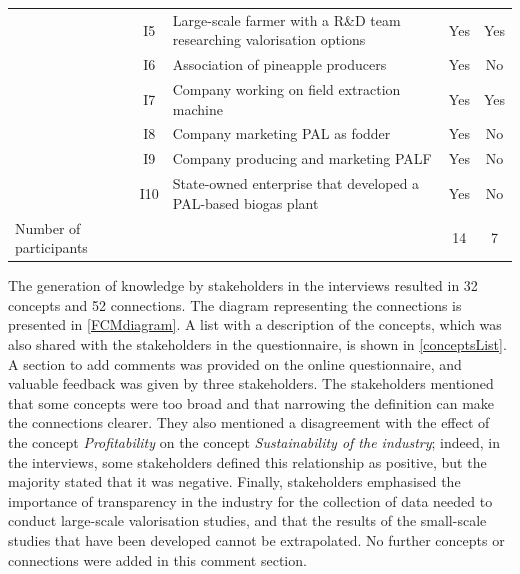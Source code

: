 \begin{table}[ht]
{\begin{threeparttable}
\begin{tabular}{lcp{}cc}
                           & I5  & Large-scale farmer with a R\&D team researching valorisation options                             &    Yes                   & Yes \\
                           & I6  & Association of pineapple producers                                                               &      Yes                 & No  \\
                           & I7  & Company working on field extraction machine                                                      &     Yes                  & Yes \\
                           & I8  & Company marketing PAL as fodder                                                                  &      Yes                 & No  \\
                           & I9  & Company producing and marketing PALF                                                             &     Yes                  & No  \\
                           & I10 & State-owned enterprise that developed a PAL-based biogas plant                                                               &  Yes                     & No  \\ \cline{1-5} 
Number of participants  & & &  14 & 7 \\ \hline \hline
\end{tabular}
\end{threeparttable}%
}
\end{table}


The generation of knowledge by stakeholders in the interviews resulted in 32 concepts and 52 connections. The diagram representing the connections is presented in \cref{FCMdiagram}. A list with a description of the concepts, which was also shared with the stakeholders in the questionnaire, is shown in \cref{conceptsList}. A section to add comments was provided on the online questionnaire, and valuable feedback was given by three stakeholders. The stakeholders mentioned that some concepts were too broad and that narrowing the definition can make the connections clearer. They also mentioned a disagreement with the effect of the concept \textit{Profitability} on the concept \textit{Sustainability of the industry}; indeed, in the interviews, some stakeholders defined this relationship as positive, but the majority stated that it was negative. Finally, stakeholders emphasised the importance of transparency in the industry for the collection of data needed to conduct large-scale valorisation studies, and that the results of the small-scale studies that have been developed cannot be extrapolated. No further concepts or connections were added in this comment section. 

